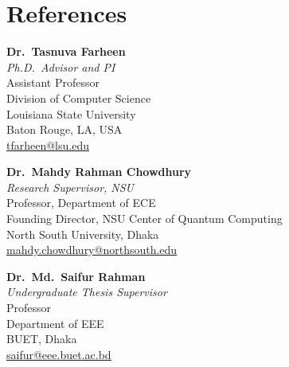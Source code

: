 \documentclass[letterpaper,11pt]{article}
\newcommand{\cvlink}[2]{\href{#1}{\underline{#2}}}
\newenvironment{cvblock}
  {\par\noindent\begin{minipage}[t]{\textwidth}\raggedright}
  {\end{minipage}\par\vspace{5pt}}
\begin{document}
\section{References}
\begin{cvblock}
\small
\begin{minipage}[t]{0.32\textwidth}\raggedright
  \textbf{Dr.~Tasnuva Farheen}\\
  \textit{Ph.D.\ Advisor and PI}\\
  Assistant Professor\\
  Division of Computer Science\\
  Louisiana State University\\
  Baton Rouge, LA, USA\\
  \cvlink{mailto:tfarheen@lsu.edu}{tfarheen@lsu.edu}
\end{minipage}\hfill
\begin{minipage}[t]{0.32\textwidth}\raggedright
  \textbf{Dr.~Mahdy Rahman Chowdhury}\\
  \textit{Research Supervisor, NSU}\\
  Professor, Department of ECE\\
  Founding Director, NSU Center of Quantum Computing\\
  North South University, Dhaka\\
  \cvlink{mailto:mahdy.chowdhury@northsouth.edu}{mahdy.chowdhury@northsouth.edu}
\end{minipage}\hfill
\begin{minipage}[t]{0.32\textwidth}\raggedright
  \textbf{Dr.~Md.~Saifur Rahman}\\
  \textit{Undergraduate Thesis Supervisor}\\
  Professor\\
  Department of EEE\\
  BUET, Dhaka\\
  \cvlink{mailto:saifur@eee.buet.ac.bd}{saifur@eee.buet.ac.bd}
\end{minipage}
\end{cvblock}
\end{document}
